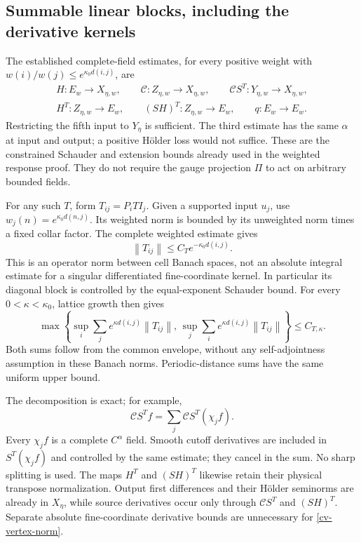 \documentclass[11pt]{article}
\theoremstyle{remark}
\newcommand{\norm}[1]{\left\|#1\right\|}
\begin{document}
\subsection{Summable linear blocks, including the derivative kernels}
\label{cv-linear-section}

The established complete-field estimates, for every positive
weight with $w(i)/w(j)\le e^{\kappa_0d(i,j)}$, are
\begin{equation}\label{cv-linear-inputs}
 \begin{gathered}
 H:E_w\to X_{\eta,w},\qquad
 \mathcal C:Z_{\eta,w}\to X_{\eta,w},\qquad
 \mathcal CS^T:Y_{\eta,w}\to X_{\eta,w},\\
 H^T:Z_{\eta,w}\to E_w,\qquad
 (SH)^T:Z_{\eta,w}\to E_w,\qquad q:E_w\to E_w.
 \end{gathered}
\end{equation}
Restricting the fifth input to $Y_\eta$ is sufficient.
The third estimate has the same $\alpha$ at input and
output; a positive H\"older loss would not suffice.
These are the constrained Schauder and extension bounds
already used in the weighted response proof. They do not
require the gauge projection $\Pi$ to act on arbitrary
bounded fields.

For any such $T$, form $T_{ij}=P_iTI_j$. Given a supported
input $u_j$, use $w_j(n)=e^{\kappa_0d(n,j)}$. Its weighted
norm is bounded by its unweighted norm times a fixed collar
factor. The complete weighted estimate gives
\begin{equation}\label{cv-block-envelope}
 \norm{T_{ij}}\le C_Te^{-\kappa_0d(i,j)}.
\end{equation}
This is an operator norm between cell Banach spaces, not an
absolute integral estimate for a singular differentiated
fine-coordinate kernel. In particular its diagonal block is
controlled by the equal-exponent Schauder bound.
For every $0<\kappa<\kappa_0$, lattice growth then gives
\begin{equation}\label{cv-block-schur}
 \max\left\{
  \sup_i\sum_je^{\kappa d(i,j)}\norm{T_{ij}},\,
  \sup_j\sum_ie^{\kappa d(i,j)}\norm{T_{ij}}\right\}
                \le C_{T,\kappa}.
\end{equation}
Both sums follow from the common envelope, without any
self-adjointness assumption in these Banach norms.
Periodic-distance sums have the same uniform upper bound.

The decomposition is exact; for example,
\begin{equation}\label{cv-exact-linear-splitting}
 \mathcal CS^Tf=\sum_j\mathcal CS^T(\chi_jf).
\end{equation}
Every $\chi_jf$ is a complete $C^\alpha$ field. Smooth
cutoff derivatives are included in $S^T(\chi_jf)$ and
controlled by the same estimate; they cancel in the sum.
No sharp splitting is used. The maps $H^T$ and $(SH)^T$
likewise retain their physical transpose normalization.
Output first differences and their H\"older seminorms are
already in $X_\eta$, while source derivatives occur only
through $\mathcal CS^T$ and $(SH)^T$. Separate absolute
fine-coordinate derivative bounds are unnecessary for
\eqref{cv-vertex-norm}.
\end{document}
